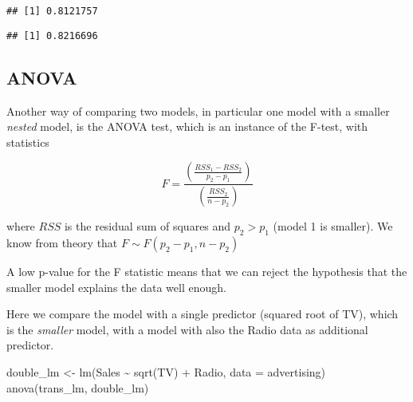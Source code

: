 \documentclass[
  oneside]{book}
\newenvironment{Shaded}{\begin{snugshade}}{\end{snugshade}}
\newcommand{\AttributeTok}[1]{\textcolor[rgb]{0.77,0.63,0.00}{#1}}
\newcommand{\FunctionTok}[1]{\textcolor[rgb]{0.00,0.00,0.00}{#1}}
\newcommand{\NormalTok}[1]{#1}
\newcommand{\OtherTok}[1]{\textcolor[rgb]{0.56,0.35,0.01}{#1}}
\newcommand{\SpecialCharTok}[1]{\textcolor[rgb]{0.00,0.00,0.00}{#1}}
\begin{document}
\begin{Shaded}
\end{Shaded}

\begin{verbatim}
## [1] 0.8121757
\end{verbatim}

\begin{Shaded}
\end{Shaded}

\begin{verbatim}
## [1] 0.8216696
\end{verbatim}

\hypertarget{anova}{%
\subsection{ANOVA}\label{anova}}

Another way of comparing two models, in particular one model with
a smaller \emph{nested} model, is the ANOVA test, which is an instance
of the F-test, with statistics

\[
F = \frac{\left(\frac{RSS_1 - RSS_2}{p_2 - p_1}\right)}{\left(\frac{RSS_2}{n - p_2}\right)}
\]

where \(RSS\) is the residual sum of squares and \(p_2 > p_1\) (model 1 is
smaller). We know from theory that \(F \sim F(p_2 - p_1, n - p_2)\)

A low p-value for the F statistic means that we can reject the hypothesis that
the smaller model explains the data well enough.

Here we compare the model with a single predictor (squared root of TV), which
is the \emph{smaller} model, with a model with also the Radio data as
additional predictor.

\begin{Shaded}
\begin{Highlighting}[]
\NormalTok{double\_lm }\OtherTok{\textless{}{-}} \FunctionTok{lm}\NormalTok{(Sales }\SpecialCharTok{\textasciitilde{}} \FunctionTok{sqrt}\NormalTok{(TV) }\SpecialCharTok{+}\NormalTok{ Radio, }\AttributeTok{data =}\NormalTok{ advertising)}
\FunctionTok{anova}\NormalTok{(trans\_lm, double\_lm)}
\end{Highlighting}
\end{Shaded}
\end{document}
